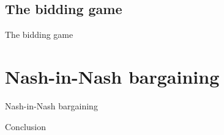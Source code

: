 \documentclass[aspectratio=169]{beamer}  %
\begin{document}
\subsection{The bidding game}
\begin{frame}{The bidding game}

\end{frame}

\section{Nash-in-Nash bargaining}
\begin{frame}{Nash-in-Nash bargaining}
    
\end{frame}





\begin{frame}{Conclusion}

\end{frame}
\end{document}
